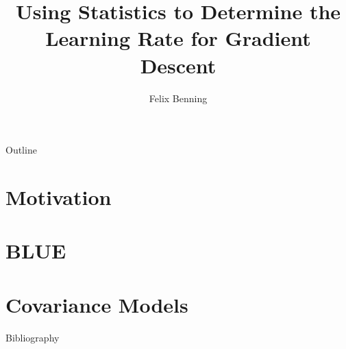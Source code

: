 \documentclass[
	handout,
	hyperref={unicode, colorlinks=true, linkcolor=.}
]{beamer}
\title{Using Statistics to Determine the Learning Rate for Gradient Descent}
\author{Felix Benning}
\institute{University of Mannheim}
\begin{document}
	\frame{\titlepage}

	\begin{frame}{Outline}
		\tableofcontents
	\end{frame}


	\section{Motivation}

	
	
	
	

	\section{BLUE}

	\section{Covariance Models}


	\appendix

	\begin{frame}{Bibliography}
		\printbibliography
	\end{frame}
\end{document}
